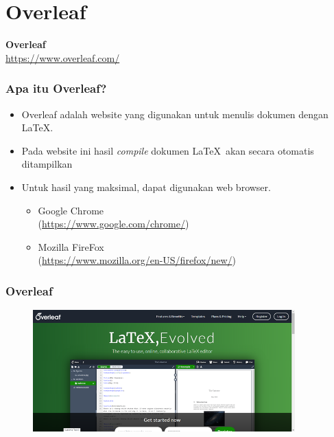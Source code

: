 \documentclass[aspectratio=169]{beamer}
\begin{document}
\section{Overleaf}
\begin{frame}
\centering
\textbf{\Huge Overleaf}\\
\Large \url{https://www.overleaf.com/}
\end{frame}

\begin{frame}
\frametitle{Apa itu Overleaf?}
\begin{itemize}
    \item Overleaf adalah website yang digunakan untuk menulis dokumen dengan \LaTeX.
    \item Pada website ini hasil \textit{compile} dokumen \LaTeX\ akan secara otomatis ditampilkan
    \item Untuk hasil yang maksimal, dapat digunakan web browser.
    \begin{itemize}
        \item Google Chrome\\
        (\url{https://www.google.com/chrome/})
        \item Mozilla FireFox\\
        (\url{https://www.mozilla.org/en-US/firefox/new/})
    \end{itemize}
\end{itemize}
\end{frame}

\begin{frame}
\frametitle{\textbf{Overleaf}}
\begin{figure}
    \centering
    \includegraphics[width=0.9\textwidth]{gambar/overleaf.png}
\end{figure}
\end{frame}
\end{document}

